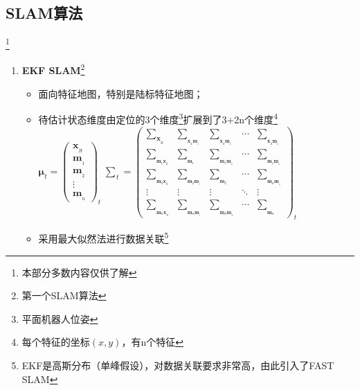 \documentclass[../main.tex]{subfiles}
\begin{document}
\subsection{SLAM算法}\footnote{本部分多数内容仅供了解}
\begin{enumerate}
    \item \textbf{EKF SLAM}\footnote{第一个SLAM算法}
        \begin{itemize}
            \item 面向特征地图，特别是陆标特征地图；
            \item 待估计状态维度由定位的3个维度\footnote{平面机器人位姿}扩展到了3+2n个维度\footnote{每个特征的坐标$(x,y)$，有n个特征}\\
            \( {\mathbf{\mu }}_{t} = {\left( \begin{matrix} {\mathbf{x}}_{{}_{R}} \\  {\mathbf{m}}_{{}_{1}} \\  {\mathbf{m}}_{{}_{2}} \\  \vdots \\  {\mathbf{m}}_{{}_{n}} \end{matrix}\right) }_{t}\;{\overset{ }{\sum }}_{t} = {\left( \begin{matrix} \mathop{\sum }\limits_{{\mathbf{x}}_{{}_{R}}} & \mathop{\sum }\limits_{{}_{{\mathbf{x}}_{{}_{R}}{\mathbf{m}}_{{}_{1}}}} & \mathop{\sum }\limits_{{}_{{\mathbf{x}}_{{}_{R}}{\mathbf{m}}_{{}_{2}}}} & \cdots & \mathop{\sum }\limits_{{}_{{\mathbf{x}}_{{}_{R}}{\mathbf{m}}_{{}_{n}}}} \\  \mathop{\sum }\limits_{{}_{{\mathbf{m}}_{1}{\mathbf{x}}_{{}_{R}}}} & \mathop{\sum }\limits_{{}_{{\mathbf{m}}_{1}}} & \mathop{\sum }\limits_{{}_{{\mathbf{m}}_{1}{\mathbf{m}}_{{}_{2}}}} & \cdots & \mathop{\sum }\limits_{{}_{{\mathbf{m}}_{1}{\mathbf{m}}_{{}_{n}}}} \\  \mathop{\sum }\limits_{{}_{{\mathbf{m}}_{2}{\mathbf{x}}_{{}_{R}}}} & \mathop{\sum }\limits_{{}_{{\mathbf{m}}_{2}{\mathbf{m}}_{{}_{1}}}} & \mathop{\sum }\limits_{{}_{{\mathbf{m}}_{2}}} & \cdots & \mathop{\sum }\limits_{{}_{{\mathbf{m}}_{n}{\mathbf{m}}_{{}_{n}}}} \\  \vdots & \vdots & \vdots &  \ddots  & \vdots \\  \mathop{\sum }\limits_{{}_{{\mathbf{m}}_{n}{\mathbf{x}}_{{}_{R}}}} & \mathop{\sum }\limits_{{}_{{\mathbf{m}}_{n}{\mathbf{m}}_{{}_{1}}}} & \mathop{\sum }\limits_{{}_{{\mathbf{m}}_{n}{\mathbf{m}}_{{}_{2}}}} & \cdots & \mathop{\sum }\limits_{{}_{{\mathbf{m}}_{n}}} \end{matrix}\right) }_{t} \)
            \item 采用最大似然法进行数据关联\footnote{EKF是高斯分布（单峰假设），对数据关联要求非常高，由此引入了FAST SLAM}
        \end{itemize}


\end{enumerate}
\end{document}
